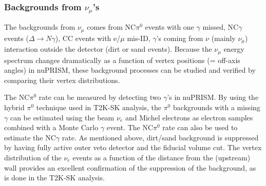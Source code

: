 \subsubsection{Backgrounds from $\nu_\mu$'s}
The backgrounds from $\nu_\mu$ comes from NC$\pi^0$ events with one $\gamma$ missed, NC$\gamma$ events ($\Delta \rightarrow N \gamma$), CC events with e/$\mu$ mis-ID, $\gamma$'s coming from $\nu$ (mainly $\nu_\mu$) interaction outside the detector (dirt or sand events). Because the $\nu_\mu$ energy spectrum changes dramatically as a function of vertex positions (= off-axis angles) in nuPRISM, these background processes can be studied and verified by comparing their vertex distributions. 

The NC$\pi^0$ rate can be measured by detecting two $\gamma$'s in nuPRISM. By using the hybrid $\pi^0$ technique used in T2K-SK analysis, the $\pi^0$ backgrounds with a missing $\gamma$ can be estimated using the beam $\nu_e$ and Michel electrons as electron samples combined with a Monte Carlo $\gamma$ event. The NC$\pi^0$ rate can also be used to estimate the NC$\gamma$ rate. As mentioned above, dirt/sand background is suppressed by having fully active outer veto detector and the fiducial volume cut. The vertex distribution of the $\nu_e$ events as a function of the distance from the (upstream) wall provides an excellent confirmation of the suppression of the background, as is done in the T2K-SK analysis.


